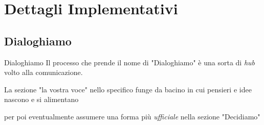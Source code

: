 \section{Dettagli Implementativi}

\subsection{Dialoghiamo}
\begin{frame}{Dialoghiamo}
  Il processo che prende il nome di "Dialoghiamo" è una sorta di \emph{hub} volto alla comunicazione.

  La sezione "la vostra voce" nello specifico funge da bacino in cui pensieri e idee nascono e si alimentano

  per poi eventualmente assumere una forma più \emph{ufficiale} nella sezione "Decidiamo"
\end{frame}
